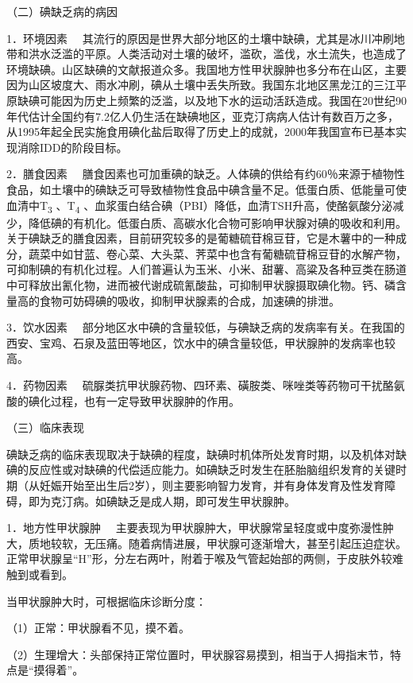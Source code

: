 （二）碘缺乏病的病因

{1．环境因素}
　其流行的原因是世界大部分地区的土壤中缺碘，尤其是冰川冲刷地带和洪水泛滥的平原。人类活动对土壤的破坏，滥砍，滥伐，水土流失，也造成了环境缺碘。山区缺碘的文献报道众多。我国地方性甲状腺肿也多分布在山区，主要因为山区坡度大、雨水冲刷，碘从土壤中丢失所致。我国东北地区黑龙江的三江平原缺碘可能因为历史上频繁的泛滥，以及地下水的运动活跃造成。我国在20世纪90年代估计全国约有7.2亿人仍生活在缺碘地区，亚克汀病病人估计有数百万之多，从1995年起全民实施食用碘化盐后取得了历史上的成就，2000年我国宣布已基本实现消除IDD的阶段目标。

{2．膳食因素}
　膳食因素也可加重碘的缺乏。人体碘的供给有约60％来源于植物性食品，如土壤中的碘缺乏可导致植物性食品中碘含量不足。低蛋白质、低能量可使血清中T\textsubscript{3}
、T\textsubscript{4}
、血浆蛋白结合碘（PBI）降低，血清TSH升高，使酪氨酸分泌减少，降低碘的有机化。低蛋白质、高碳水化合物可影响甲状腺对碘的吸收和利用。关于碘缺乏的膳食因素，目前研究较多的是葡糖硫苷棉豆苷，它是木薯中的一种成分，蔬菜中如甘蓝、卷心菜、大头菜、荠菜中也含有葡糖硫苷棉豆苷的水解产物，可抑制碘的有机化过程。人们普遍认为玉米、小米、甜薯、高粱及各种豆类在肠道中可释放出氰化物，进而被代谢成硫氰酸盐，可抑制甲状腺摄取碘化物。钙、磷含量高的食物可妨碍碘的吸收，抑制甲状腺素的合成，加速碘的排泄。

{3．饮水因素}
　部分地区水中碘的含量较低，与碘缺乏病的发病率有关。在我国的西安、宝鸡、石泉及蓝田等地区，饮水中的碘含量较低，甲状腺肿的发病率也较高。

{4．药物因素}
　硫脲类抗甲状腺药物、四环素、磺胺类、咪唑类等药物可干扰酪氨酸的碘化过程，也有一定导致甲状腺肿的作用。

（三）临床表现

碘缺乏病的临床表现取决于缺碘的程度，缺碘时机体所处发育时期，以及机体对缺碘的反应性或对缺碘的代偿适应能力。如碘缺乏时发生在胚胎脑组织发育的关键时期（从妊娠开始至出生后2岁），则主要影响智力发育，并有身体发育及性发育障碍，即为克汀病。如碘缺乏是成人期，即可发生甲状腺肿。

{1．地方性甲状腺肿}
　主要表现为甲状腺肿大，甲状腺常呈轻度或中度弥漫性肿大，质地较软，无压痛。随着病情进展，甲状腺可逐渐增大，甚至引起压迫症状。正常甲状腺呈“H”形，分左右两叶，附着于喉及气管起始部的两侧，于皮肤外较难触到或看到。

当甲状腺肿大时，可根据临床诊断分度：

（1）正常：甲状腺看不见，摸不着。

（2）生理增大：头部保持正常位置时，甲状腺容易摸到，相当于人拇指末节，特点是“摸得着”。

